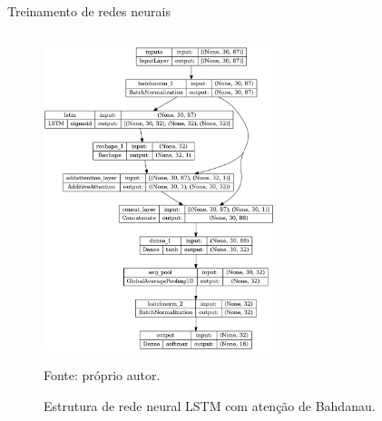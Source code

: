 \begin{frame}{Treinamento de redes neurais}
\begin{columns}
\begin{column}{0.5\textwidth}
                \begin{figure}[htpb]
                    \centering
                    \caption{Estrutura de rede neural LSTM com atenção de Bahdanau.}
                    \label{fig:model_lstm_BauhAtt}
                    \includegraphics[width=0.6\textwidth]{./images/model_lstm_BauhAtt.png}
                    \par \footnotesize Fonte: próprio autor.
                \end{figure}

            \end{column}
        \end{columns}

        
    \end{frame}





